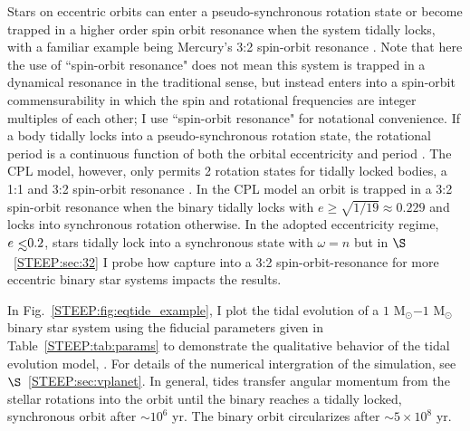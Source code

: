 Stars on eccentric orbits can enter a pseudo-synchronous rotation state or become trapped in a higher order spin orbit resonance when the system tidally locks, with a familiar example being Mercury's 3:2 spin-orbit resonance \citep{GoldreichPeale1966}.  Note that here the use of ``spin-orbit resonance" does not mean this system is trapped in a dynamical resonance in the traditional sense, but instead enters into a spin-orbit commensurability in which the spin and rotational frequencies are integer multiples of each other; I use ``spin-orbit resonance" for notational convenience.  If a body tidally locks into a pseudo-synchronous rotation state, the rotational period is a continuous function of both the orbital eccentricity and period \citep[see][]{Goldreich1966b,Wisdom2008}.  The CPL model, however, only permits 2 rotation states for tidally locked bodies, a 1:1 and 3:2 spin-orbit resonance \citep{Barnes2017}.  In the CPL model an orbit is trapped in a 3:2 spin-orbit resonance when the binary tidally locks with $e \geq \sqrt{1/19} \approx 0.229$ \citep{FerrazMello2008} and locks into synchronous rotation otherwise.  In the adopted eccentricity regime, $e \lsim 0.2$, stars tidally lock into a synchronous state with $\omega = n$ but in $\S$~\ref{STEEP:sec:32} I probe how capture into a 3:2 spin-orbit-resonance for more eccentric binary star systems impacts the results. 

In Fig.~\ref{STEEP:fig:eqtide_example}, I plot the tidal evolution of a $1$ M$_{\odot}$$-1$ M$_{\odot}$ binary star system using the fiducial parameters given in Table~\ref{STEEP:tab:params} to demonstrate the qualitative behavior of the tidal evolution model, \eqtide.  For details of the numerical intergration of the simulation, see $\S$~\ref{STEEP:sec:vplanet}.  In general, tides transfer angular momentum from the stellar rotations into the orbit until the binary reaches a tidally locked, synchronous orbit after ${\sim}10^6$ yr.  The binary orbit circularizes after ${\sim} 5 \times 10^8$ yr.

